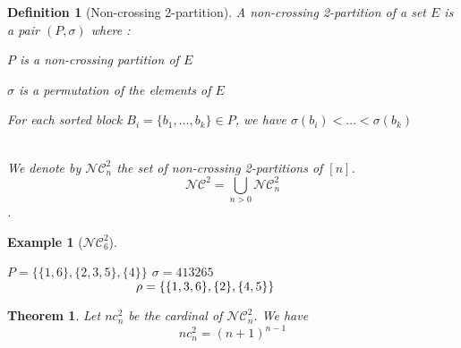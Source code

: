 \documentclass[12pt]{report}
\newtheorem{theorem}{Theorem}
\newtheorem{definition}{Definition}
\newtheorem*{example}{Example}
\begin{document}
\begin{definition}[Non-crossing 2-partition]
    A \emph{non-crossing 2-partition} of a set $E$ is a pair $(P, \sigma)$
    where :\\
    \begin{itemize*}
        \item $P$ is a non-crossing partition of $E$\\
        \item $\sigma$ is a permutation of the elements of $E$\\
        \item For each \emph{sorted} block
            $B_i = \{b_1, \ldots, b_k\} \in P$, we have
            $\sigma (b_i) < \ldots < \sigma (b_k)$\\\\
    \end{itemize*}
    We denote by $\mathcal{NC}^2_n$ the set of non-crossing
    2-partitions of $[n]$.
    $$\mathcal{NC}^2 = \bigcup_{n > 0}{\mathcal{NC}^2_n}$$.
\end{definition}

\begin{example}[$\mathcal{NC}^2_6$]
    \begin{itemize*}
            \subitem $P = \{\{1, 6\}, \{2, 3, 5\}, \{4\}\}$
            \subitem $\sigma = 413265$ \\
            \subitem $\hspace{36mm} \rho = \{\{1, 3, 6\}, \{2\}, \{4, 5\}\}$
    \end{itemize*}    
\end{example}

\begin{theorem}
    Let $nc^2_n$ be the cardinal of $\mathcal{NC}^2_n$.
    We have $$nc^2_n = (n + 1)^{n-1}$$
\end{theorem}
\end{document}
